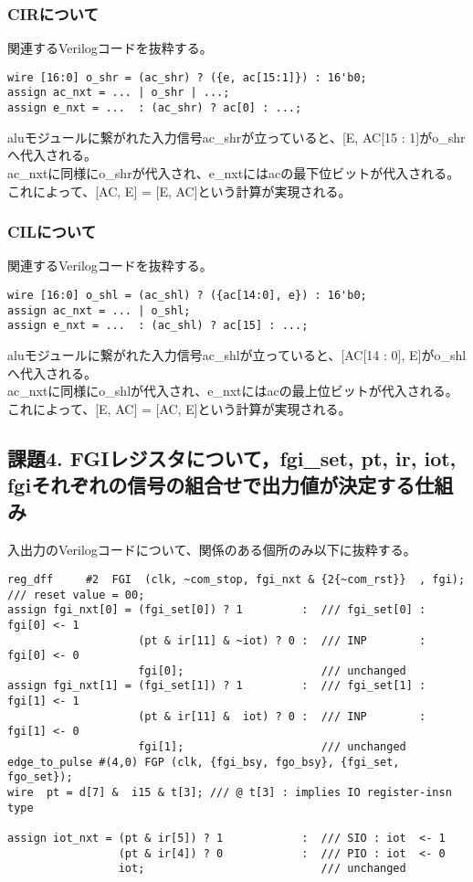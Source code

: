 \documentclass{jsarticle}
\begin{document}
\subsubsection*{CIRについて}
関連するVerilogコードを抜粋する。
\begin{lstlisting}
wire [16:0] o_shr = (ac_shr) ? ({e, ac[15:1]}) : 16'b0;
assign ac_nxt = ... | o_shr | ...;
assign e_nxt = ...  : (ac_shr) ? ac[0] : ...;
\end{lstlisting}
aluモジュールに繋がれた入力信号ac\_shrが立っていると、[E, AC[15 : 1]がo\_shrへ代入される。\\
ac\_nxtに同様にo\_shrが代入され、e\_nxtにはacの最下位ビットが代入される。\\
これによって、[AC, E] = [E, AC]という計算が実現される。

\subsubsection*{CILについて}
関連するVerilogコードを抜粋する。
\begin{lstlisting}
wire [16:0] o_shl = (ac_shl) ? ({ac[14:0], e}) : 16'b0;
assign ac_nxt = ... | o_shl;
assign e_nxt = ...  : (ac_shl) ? ac[15] : ...;
\end{lstlisting}
aluモジュールに繋がれた入力信号ac\_shlが立っていると、[AC[14 : 0], E]がo\_shlへ代入される。\\
ac\_nxtに同様にo\_shlが代入され、e\_nxtにはacの最上位ビットが代入される。\\
これによって、[E, AC] = [AC, E]という計算が実現される。

\subsection*{課題4. FGIレジスタについて，fgi\_set, pt, ir, iot, fgiそれぞれの信号の組合せで出力値が決定する仕組み}
入出力のVerilogコードについて、関係のある個所のみ以下に抜粋する。
\begin{lstlisting}
reg_dff     #2  FGI  (clk, ~com_stop, fgi_nxt & {2{~com_rst}}  , fgi);  /// reset value = 00;
assign fgi_nxt[0] = (fgi_set[0]) ? 1         :  /// fgi_set[0] : fgi[0] <- 1
                    (pt & ir[11] & ~iot) ? 0 :  /// INP        : fgi[0] <- 0
                    fgi[0];                     /// unchanged
assign fgi_nxt[1] = (fgi_set[1]) ? 1         :  /// fgi_set[1] : fgi[1] <- 1
                    (pt & ir[11] &  iot) ? 0 :  /// INP        : fgi[1] <- 0
                    fgi[1];                     /// unchanged
edge_to_pulse #(4,0) FGP (clk, {fgi_bsy, fgo_bsy}, {fgi_set, fgo_set});
wire  pt = d[7] &  i15 & t[3]; /// @ t[3] : implies IO register-insn type

assign iot_nxt = (pt & ir[5]) ? 1            :  /// SIO : iot  <- 1
                 (pt & ir[4]) ? 0            :  /// PIO : iot  <- 0
                 iot;                           /// unchanged
\end{lstlisting}
\end{document}
